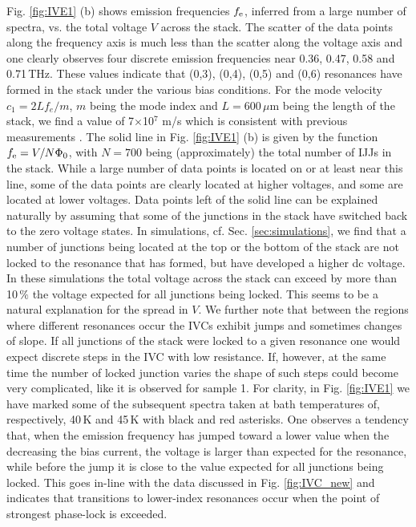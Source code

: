 \documentclass[aps,twocolumn,prb,showpacs,preprintnumbers,superscriptaddress,amsmath,amssymb,longbibliography]{revtex4-1}
\begin{document}
Fig. \ref{fig:IVE1} (b) shows emission frequencies $f_{\rm e}$, inferred from a large number of spectra, vs. the total voltage $V$ across the stack. The scatter of the data points along the frequency axis is much less than the scatter along the voltage axis and one clearly observes four discrete emission frequencies near 0.36, 0.47, 0.58 and 0.71\,THz. These values indicate that (0,3), (0,4), (0,5) and (0,6) resonances have formed in the stack under the various bias conditions. For the mode velocity $c_1 = 2Lf_e/m$, $m$ being the mode index and $L = 600$\,$\mu$m being the length of the stack, we find a value of 7$\times$10$^7$ m/s which is consistent with previous measurements \cite{Kakeya16,Kashiwagi12}.
The solid line in Fig. \ref{fig:IVE1} (b) is given by the function $f_{\rm e} = V/N\Phi_0$, with $N = 700$ being (approximately) the total number of IJJs in the stack. 
While a large number of data points is located on or at least near this line, some of the data points are clearly located at higher voltages, and some are located at lower voltages. Data points left of the solid line can be explained naturally by assuming that some of the junctions in the stack have switched back to the zero voltage states. 
In simulations, cf. Sec. \ref{sec:simulations}, we find that a number of junctions being located at the top or the bottom of the stack are not locked to the resonance that has formed, but have developed a higher dc voltage. In these simulations the total voltage across the stack can exceed by more than 10\,$\%$ the voltage expected for all junctions being locked. This seems to be a natural explanation for the spread in $V$. We further note that between the regions where different resonances occur the IVCs exhibit jumps and sometimes changes of slope. If all junctions of the stack were locked to a given resonance one would expect discrete steps in the IVC with low resistance. If, however, at the same time the number of locked junction varies the shape of such steps could become very complicated, like it is observed for sample 1. 
For clarity, in Fig. \ref{fig:IVE1} we have marked some of the subsequent spectra taken at bath temperatures of, respectively, 40\,K and 45\,K with black and red asterisks. One observes a tendency that, when the emission frequency has jumped toward a lower value when the decreasing the bias current, the voltage is larger than expected for the resonance, while before the jump it is close to the value expected for all junctions being locked. This goes in-line with the data discussed in Fig. \ref{fig:IVC_new} and indicates that transitions to lower-index resonances occur when the point of strongest phase-lock is exceeded.  
\end{document}
